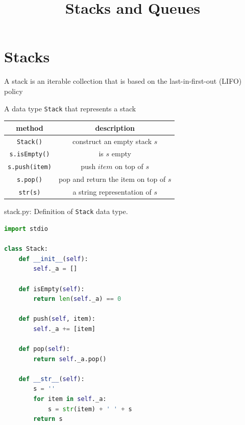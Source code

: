 \documentclass[8pt,a4paper,compress]{beamer}
\title{Stacks and Queues}
\date{}
\begin{document}
\begin{frame}
\vfill
\titlepage
\end{frame}

\section{Stacks}
\begin{frame}[fragile]
\pause

A stack is an iterable collection that is based on the last-in-first-out (LIFO) policy

\pause
\bigskip

A data type \lstinline{Stack} that represents a stack
\begin{center}
\begin{tabular}{cc}
method & description \\ \hline
\lstinline$Stack()$ & construct an empty stack $s$ \\
\lstinline$s.isEmpty()$ & is $s$ empty \\
\lstinline$s.push(item)$ & push $item$ on top of $s$ \\
\lstinline$s.pop()$ &  pop and return the item on top of $s$ \\
\lstinline$str(s)$ & a string representation of $s$
\end{tabular} 
\end{center}
\end{frame}

\begin{frame}[fragile]
\pause

\begin{framed}
\tiny stack.py: Definition of \lstinline{Stack} data type.
\end{framed}

\begin{lstlisting}[language=python,style=focusin]
import stdio

class Stack:
    def __init__(self):
        self._a = []

    def isEmpty(self):
        return len(self._a) == 0

    def push(self, item):
        self._a += [item]

    def pop(self):
        return self._a.pop()

    def __str__(self):
        s = ''
        for item in self._a:
            s = str(item) + ' ' + s
        return s
\end{lstlisting}
\end{frame}
\end{document}
